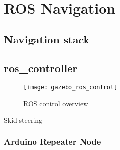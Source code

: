 \chapter{ROS Navigation}

\section{Navigation stack}

\section{ros\_controller}
\begin{figure}[h]
	\caption{ROS control overview}
	\texttt{[image: gazebo\_ros\_control]}
	\label{fig:ros_controller}
\end{figure}

Skid steering

\subsection{Arduino Repeater Node}